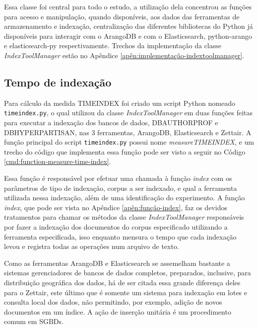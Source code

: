 		Essa classe foi central para todo o estudo, a utilização dela concentrou as funções para acesso e manipulação, quando disponíveis, aos dados das ferramentas de armazenamento e indexação, centralização das diferentes bibliotecas do Python já disponíveis para interagir com o ArangoDB e com o Elasticsearch, python-arango e elasticsearch-py respectivamente. 
		Trechos da implementação da classe \textit{IndexToolManager} estão no Apêndice \ref{apên:implementação-indextoolmanager}.
		\subsection{Tempo de indexação}
			Para cálculo da medida TIME\underscore{}INDEX foi criado um script Python nomeado \texttt{time\underscore{}index.py}, o qual utilizou da classe \textit{IndexToolManager} em duas funções feitas para executar a indexação dos bancos de dados, DB\underscore{}AUTHORPROF e DB\underscore{}HYPERPARTISAN, nas 3 ferramentas, ArangoDB, Elasticsearch e Zettair.
			A função principal do script \texttt{time\underscore{}index.py} possui nome \textit{measure\underscore{}TIME\underscore{}INDEX}, e um trecho do código que implementa essa função pode ser visto a seguir no Código \ref{cmd:function-measure-time-index}.


			Essa função é responsável por efetuar uma chamada à função \textit{index} com os parâmetros de tipo de indexação, corpus a ser indexado, e qual a ferramenta utilizada nessa indexação, além de uma identificação do experimento.
			A função \textit{index}, que pode ser vista no Apêndice \ref{apên:função-index}, faz os devidos tratamentos para chamar os métodos da classe \textit{IndexToolManager} responsáveis por fazer a indexação dos documentos do corpus especificado utilizando a ferramenta especificada, isso enquanto mensura o tempo que cada indexação levou e registra todas as operações num arquivo de texto.

			
			Como as ferramentas ArangoDB e Elasticsearch se assemelham bastante a sistemas gerenciadores de bancos de dados completos, preparados, inclusive, para distribuição geográfica dos dados, há de ser citada essa grande diferença deles para o Zettair, este último que é somente um sistema para indexação em lotes e consulta local dos dados, não permitindo, por exemplo, adição de novos documentos em um índice. 
			A ação de inserção unitária é um procedimento comum em SGBDs. 			

